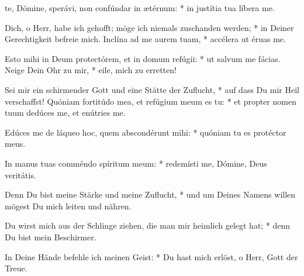 \documentclass[fontsize=10pt,paper=A5,twoside,BCOR=1mm,DIV=21,headinclude]{scrarticle}
\begin{document}

\vspace{.3em}

\begin{paracol}{2} \pcb
\begin{psalmus}
 te, Dómine, sperávi, non confúndar in ætérnum: * in justítia tua líbera me.

	\switchcolumn 
	 Dich, o Herr, habe ich gehofft; möge ich niemals zuschanden werden; * in Deiner Gerechtigkeit befreie mich.
\switchcolumn*
Inclína ad me aurem tuam, * accélera ut éruas me.

Esto mihi in Deum protectórem, et in domum refúgii: * ut salvum me fácias.
	\switchcolumn 
	Neige Dein Ohr zu mir, * eile, mich zu erretten!

	Sei mir ein schirmender Gott und eine Stätte der Zuflucht, * auf dass Du mir Heil verschaffst!
\switchcolumn*
Quóniam fortitúdo mea, et refúgium meum es tu: * et propter nomen tuum dedúces me, et enútries me.

Edúces me de láqueo hoc, quem abscondérunt mihi: * quóniam tu es protéctor meus.

In manus tuas comméndo spíritum meum: * redemísti me, Dómine, Deus veritátis.


	\switchcolumn 
	Denn Du bist meine Stärke und meine Zuflucht, * und um Deines Namens willen mögest Du mich leiten und nähren.

	Du wirst mich aus der Schlinge ziehen, die man mir heimlich gelegt hat; * denn Du bist mein Beschirmer.

	In Deine Hände befehle ich meinen Geist: * Du hast mich erlöst, o Herr, Gott der Treue.






\end{psalmus}
\end{paracol}
\end{document}
